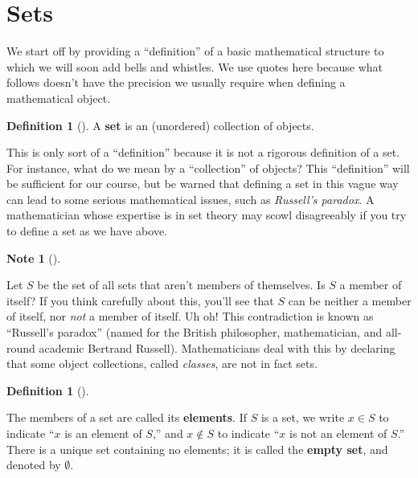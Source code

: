 \documentclass[10pt,]{book}
\newcommand{\terminology}[1]{\textbf{#1}}
\theoremstyle{plain}
\theoremstyle{definition}
\newtheorem{definition}[theorem]{Definition}
\theoremstyle{definition}
\newtheorem{note}[theorem]{Note}
\theoremstyle{definition}
\theoremstyle{definition}
\numberwithin{equation}{section}
\begin{document}
\section[{Sets}]{Sets}\label{section-1}

    We start off by providing a ``definition'' of a basic mathematical structure to which we will soon add bells and whistles. We use quotes here because what follows doesn't have the precision we usually require when defining a mathematical object.
\begin{definition}[{}]\label{definition-1}
 A \terminology{set} is an (unordered)
    collection of objects.
\end{definition}
\par

    This is only sort of  a ``definition'' because it is not a
    rigorous definition of a set. For instance, what do we mean by a
    ``collection'' of objects? This ``definition'' will be sufficient for
    our course, but be warned that defining a set in this vague way can
    lead to some serious mathematical issues, such as \emph{Russell's
    paradox}.  A mathematician whose expertise is in set
    theory may scowl disagreeably if you try to define a set as we have
    above.
\begin{note}[]\label{note-1}

    Let \(S\) be the set of all sets that aren't members
    of themselves.  Is \(S\) a member of itself? If you think carefully
    about this, you'll see that \(S\) can be neither a member of itself,
    nor \emph{not} a member of itself. Uh oh!  This contradiction
    is known as ``Russell's paradox'' (named for the British philosopher, mathematician, and all-round academic Bertrand Russell). Mathematicians deal with this by
    declaring that some object collections, called \emph{classes}, are
    not in fact sets.%
\end{note}
\begin{definition}[{}]\label{definition-2}

        The members of a set are called its \terminology{elements}. If
        \(S\) is a set, we write \(x\in S\) to indicate ``\(x\) is an element
        of \(S\),'' and \(x \not\in S\) to indicate ``\(x\) is not an element
        of \(S\).'' There is a unique set containing no elements; it is
        called the \terminology{empty set}, and denoted by \(\emptyset\).
\label{notation-1}
\label{notation-2}
\label{notation-3}
\end{definition}
\par
\end{document}
